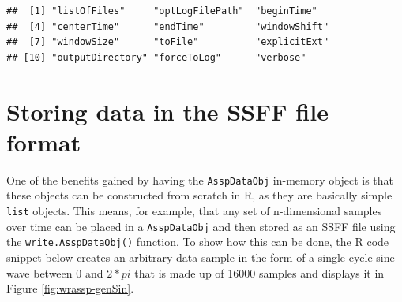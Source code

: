 \documentclass[]{book}
\newenvironment{Shaded}{\begin{snugshade}}{\end{snugshade}}
\newcommand{\CommentTok}[1]{\textcolor[rgb]{0.56,0.35,0.01}{\textit{#1}}}
\newcommand{\DataTypeTok}[1]{\textcolor[rgb]{0.13,0.29,0.53}{#1}}
\newcommand{\DecValTok}[1]{\textcolor[rgb]{0.00,0.00,0.81}{#1}}
\newcommand{\KeywordTok}[1]{\textcolor[rgb]{0.13,0.29,0.53}{\textbf{#1}}}
\newcommand{\NormalTok}[1]{#1}
\newcommand{\OperatorTok}[1]{\textcolor[rgb]{0.81,0.36,0.00}{\textbf{#1}}}
\newcommand{\OtherTok}[1]{\textcolor[rgb]{0.56,0.35,0.01}{#1}}
\newcommand{\StringTok}[1]{\textcolor[rgb]{0.31,0.60,0.02}{#1}}
\theoremstyle{definition}
\theoremstyle{definition}
\theoremstyle{definition}
\theoremstyle{remark}
\begin{document}
\begin{verbatim}
##  [1] "listOfFiles"     "optLogFilePath"  "beginTime"      
##  [4] "centerTime"      "endTime"         "windowShift"    
##  [7] "windowSize"      "toFile"          "explicitExt"    
## [10] "outputDirectory" "forceToLog"      "verbose"
\end{verbatim}

\begin{Shaded}
\end{Shaded}

\hypertarget{sec:wrassp_genSSFF}{%
\section{Storing data in the SSFF file
format}\label{sec:wrassp_genSSFF}}

One of the benefits gained by having the \texttt{AsspDataObj} in-memory
object is that these objects can be constructed from scratch in R, as
they are basically simple \texttt{list} objects. This means, for
example, that any set of n-dimensional samples over time can be placed
in a \texttt{AsspDataObj} and then stored as an SSFF file using the
\texttt{write.AsspDataObj()} function. To show how this can be done, the
R code snippet below creates an arbitrary data sample in the form of a
single cycle sine wave between \(0\) and \(2*pi\) that is made up of
16000 samples and displays it in Figure \ref{fig:wrassp-genSin}.
\end{document}
